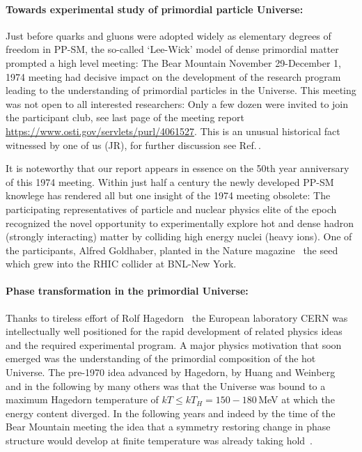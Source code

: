 \paragraph{Towards experimental study of primordial particle Universe:} Just before quarks and gluons were adopted widely as elementary degrees of freedom in PP-SM, the so-called `Lee-Wick' model of dense primordial matter prompted a high level meeting: The Bear Mountain November 29-December 1, 1974 meeting had decisive impact on the development of the research program leading to the understanding of primordial particles in the Universe. This meeting was not open to all interested researchers: Only a few dozen were invited to join the participant club, see last page of the meeting report \url{https://www.osti.gov/servlets/purl/4061527}. This is an unusual historical fact witnessed by one of us (JR), for further discussion see Ref.\,\cite{Rafelski:2019twp}. 

It is noteworthy that our report appears in essence on the 50th year anniversary of this 1974 meeting. Within just half a century the newly developed PP-SM knowlege has rendered all but one insight of the 1974 meeting obsolete: The participating representatives of particle and nuclear physics elite of the epoch recognized the novel opportunity to experimentally explore hot and dense hadron (strongly interacting) matter by colliding high energy nuclei (heavy ions). One of the participants, Alfred Goldhaber, planted in the Nature magazine~\cite{Goldhaber:1978qp} the seed which grew into the RHIC collider at BNL-New York. 

\paragraph{Phase transformation in the primordial Universe:} Thanks to tireless effort of Rolf Hagedorn~\cite{Rafelski:2016hnq} the European laboratory CERN was intellectually well positioned for the rapid development of related physics ideas and the required experimental program. A major physics motivation that soon emerged was the understanding of the primordial composition of the hot Universe. The pre-1970 idea advanced by Hagedorn, by Huang and Weinberg~\cite{Huang:1970iq} and in the following by many others was that the Universe was bound to a maximum Hagedorn temperature of $kT\le kT_H=150-180$\,MeV at which the energy content diverged. In the following years and indeed by the time of the Bear Mountain meeting the idea that a symmetry restoring change in phase structure would develop at finite temperature was already taking hold~\cite{Weinberg:1974hy,Harrington:1974fc}.

